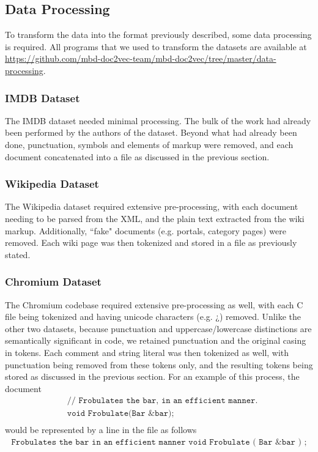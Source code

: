 \documentclass[11pt]{article}
\newcommand{\CPP}
{C\nolinebreak[4]\hspace{-.05em}\raisebox{.22ex}{\footnotesize\bf ++\ }}
\begin{document}
\subsection*{Data Processing}
To transform the data into the format previously described, some data processing
is required. All programs that we used to transform the datasets are available at
\url{https://github.com/mbd-doc2vec-team/mbd-doc2vec/tree/master/data-processing}.

\subsubsection*{IMDB Dataset}
The IMDB dataset needed minimal processing. The bulk of the work had already been
performed by the authors of the dataset. Beyond what had already been done,
punctuation, symbols and elements of markup were removed, and each document
concatenated into a file as discussed in the previous section.

\subsubsection*{Wikipedia Dataset}
The Wikipedia dataset required extensive pre-processing, with each document
needing to be parsed from the XML, and the plain text extracted from the wiki
markup. Additionally, ``fake" documents (e.g. portals, category pages) were
removed. Each wiki page was then tokenized and stored in a file as previously
stated.

\subsubsection*{Chromium Dataset}
The Chromium codebase required extensive pre-processing as well, with each \CPP
file being tokenized and having unicode characters (e.g. ¿) removed.
Unlike the other two datasets, because punctuation and uppercase/lowercase
distinctions are semantically significant in code, we retained punctuation and
the original casing in tokens.
Each comment and string literal was then tokenized as well, with punctuation
being removed from these tokens only, and the resulting tokens being stored as
discussed in the previous section. For an example of this process, the
document
\begin{align*}
&\texttt{// Frobulates the bar, in an efficient manner.}\\
&\texttt{void Frobulate(Bar \&bar);}\\
\end{align*}
would be represented by a line in the file as follows\\
\begin{align*}
\texttt{Frobulates the bar in an efficient manner void Frobulate ( Bar \& bar ) ;}
\end{align*}
\end{document}
